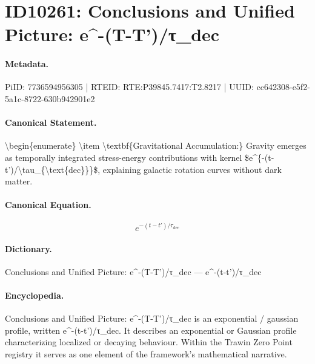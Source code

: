 \section*{ID10261: Conclusions and Unified Picture: e\textasciicircum{}-(T-T')/τ\_dec}
\paragraph{Metadata.}
PiID: 7736594956305 | RTEID: RTE:P39845.7417:T2.8217 | UUID: cc642308-e5f2-5a1c-8722-630b942901e2

\paragraph{Canonical Statement.}
\textbackslash{}begin\{enumerate\} \textbackslash{}item \textbackslash{}textbf\{Gravitational Accumulation:\} Gravity emerges as temporally integrated stress-energy contributions with kernel \$e\textasciicircum{}\{-(t-t')/\textbackslash{}tau\_\{\textbackslash{}text\{dec\}\}\}\$, explaining galactic rotation curves without dark matter.

\paragraph{Canonical Equation.}
\[
e^{-(t-t')/\tau_{\text{dec}}}
\]

\paragraph{Dictionary.}
Conclusions and Unified Picture: e\textasciicircum{}-(T-T')/τ\_dec — e\textasciicircum{}-(t-t')/τ\_dec

\paragraph{Encyclopedia.}
Conclusions and Unified Picture: e\textasciicircum{}-(T-T')/τ\_dec is an exponential / gaussian profile, written e\textasciicircum{}-(t-t')/τ\_dec. It describes an exponential or Gaussian profile characterizing localized or decaying behaviour. Within the Trawin Zero Point registry it serves as one element of the framework's mathematical narrative.
